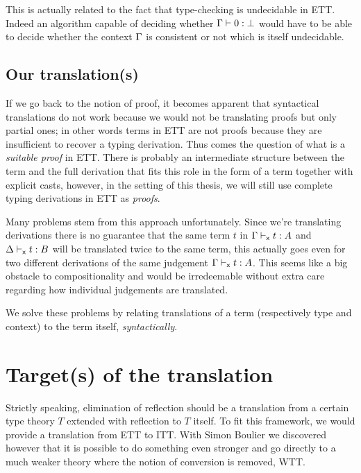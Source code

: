 This is actually related to the fact that type-checking is undecidable in
\acrshort{ETT}. Indeed an algorithm capable of deciding whether
\(\Gamma \vdash 0 : \bot\) would have to be able to decide whether the context
\(\Gamma\) is consistent or not which is itself undecidable.

\subsection{Our translation(s)}

If we go back to the notion of proof, it becomes apparent that
syntactical translations do not work because we would not be translating proofs
but only partial ones; in other words terms in \acrshort{ETT} are not proofs
because they are insufficient to recover a typing derivation.
Thus comes the question of what is a \emph{suitable proof} in \acrshort{ETT}.
There is probably an intermediate structure between the term and the full
derivation that fits this role in the form of a term together with explicit
casts, however, in the setting of this thesis, we will still use complete
typing derivations in \acrshort{ETT} as \emph{proofs}.

Many problems stem from this approach unfortunately. Since we're translating
derivations there is no guarantee that the same term \(t\) in
\(\Gamma \vdash_{\mathsf{x}} t : A\) and \(\Delta \vdash_{\mathsf{x}} t : B\) will be translated
twice to the same term, this actually goes even for two different derivations
of the same judgement \(\Gamma \vdash_{\mathsf{x}} t : A\).
This seems like a big obstacle to compositionality and would be irredeemable
without extra care regarding how individual judgements are translated.

We solve these problems by relating translations of a term (respectively
type and context) to the term itself, \emph{syntactically}.

\section{Target(s) of the translation}

Strictly speaking, elimination of reflection should be a translation from a
certain type theory \(T\) extended with reflection to \(T\) itself.
To fit this framework, we would provide a translation from \acrshort{ETT}
to \acrshort{ITT}. With Simon Boulier we discovered however that it is possible
to do something even stronger and go directly to a much weaker theory where
the notion of conversion is removed, \acrshort{WTT}.

